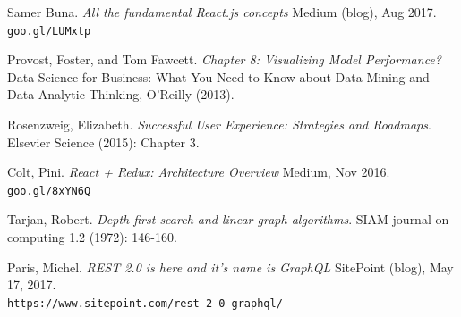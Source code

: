 \documentclass[sigconf]{acmart}
\begin{document}
\begin{thebibliography}{9}
\bibitem{} 
Samer Buna.
\textit{All the fundamental React.js concepts}
Medium (blog), Aug 2017.
\\\texttt{goo.gl/LUMxtp}

\bibitem{} 
Provost, Foster, and Tom Fawcett.
\textit{Chapter 8: Visualizing Model Performance?}
Data Science for Business: What You Need to Know about Data Mining and Data-Analytic Thinking, O'Reilly (2013).

\bibitem{} 
Rosenzweig, Elizabeth.
\textit{Successful User Experience: Strategies and Roadmaps}.
Elsevier Science (2015): Chapter 3.

\bibitem{} 
Colt, Pini.
\textit{React + Redux: Architecture Overview}
Medium, Nov 2016.
\\\texttt{goo.gl/8xYN6Q}

\bibitem{} 
Tarjan, Robert.
\textit{Depth-first search and linear graph algorithms}.
SIAM journal on computing 1.2 (1972): 146-160.

\bibitem{} 
Paris, Michel.
\textit{REST 2.0 is here and it’s name is GraphQL}
SitePoint (blog), May 17, 2017.
\\\texttt{https://www.sitepoint.com/rest-2-0-graphql/}


\end{thebibliography}
\end{document}

